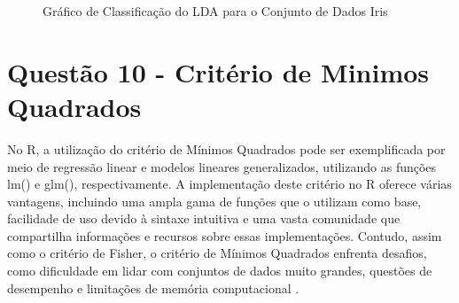 \documentclass[
  a4paperpaper,
]{article}
\newenvironment{Shaded}{\begin{snugshade}}{\end{snugshade}}
\newcommand{\AttributeTok}[1]{\textcolor[rgb]{0.40,0.45,0.13}{#1}}
\newcommand{\CommentTok}[1]{\textcolor[rgb]{0.37,0.37,0.37}{#1}}
\newcommand{\DecValTok}[1]{\textcolor[rgb]{0.68,0.00,0.00}{#1}}
\newcommand{\FunctionTok}[1]{\textcolor[rgb]{0.28,0.35,0.67}{#1}}
\newcommand{\NormalTok}[1]{\textcolor[rgb]{0.00,0.23,0.31}{#1}}
\newcommand{\SpecialCharTok}[1]{\textcolor[rgb]{0.37,0.37,0.37}{#1}}
\newcommand{\StringTok}[1]{\textcolor[rgb]{0.13,0.47,0.30}{#1}}
\begin{document}
\begin{Shaded}
\end{Shaded}

\begin{figure}[H]


\caption{\label{fig-ldairis}Gráfico de Classificação do LDA para o
Conjunto de Dados Iris}

\end{figure}%

\newpage{}

\section{Questão 10 - Critério de Minimos
Quadrados}\label{questuxe3o-10---crituxe9rio-de-minimos-quadrados}

No R, a utilização do critério de Mínimos Quadrados pode ser
exemplificada por meio de regressão linear e modelos lineares
generalizados, utilizando as funções lm() e glm(), respectivamente. A
implementação deste critério no R oferece várias vantagens, incluindo
uma ampla gama de funções que o utilizam como base, facilidade de uso
devido à sintaxe intuitiva e uma vasta comunidade que compartilha
informações e recursos sobre essas implementações. Contudo, assim como o
critério de Fisher, o critério de Mínimos Quadrados enfrenta desafios,
como dificuldade em lidar com conjuntos de dados muito grandes, questões
de desempenho e limitações de memória computacional .
\end{document}
